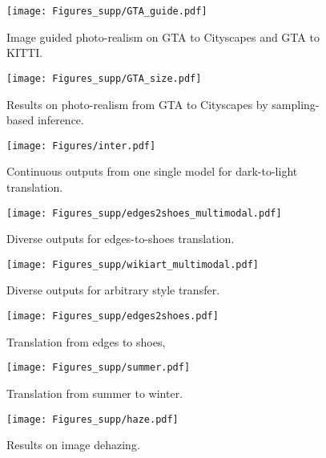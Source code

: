 \documentclass[runningheads]{llncs}
\begin{document}
\begin{figure*}
  \centering
  \texttt{[image: Figures\_supp/GTA\_guide.pdf]}
  \caption{Image guided photo-realism on GTA\cite{richter2016playing} to Cityscapes\cite{cordts2016cityscapes} and GTA to KITTI\cite{geiger2015kitti}.}
  \label{fig:gg}
\end{figure*}

\begin{figure*}
  \centering
  \texttt{[image: Figures\_supp/GTA\_size.pdf]}
  \caption{Results on photo-realism from GTA\cite{richter2016playing} to Cityscapes\cite{cordts2016cityscapes} by sampling-based inference.}
  \label{fig:gs}
\end{figure*}

\begin{figure*}
  \centering
  \texttt{[image: Figures/inter.pdf]}
  \caption{Continuous outputs from one single model for dark-to-light translation.}
  \label{fig:interpolation}
\end{figure*}

\begin{figure*}
  \centering
  \texttt{[image: Figures\_supp/edges2shoes\_multimodal.pdf]}
  \caption{Diverse outputs for edges-to-shoes translation.}
  \label{fig:edge2shoe_multimodal}
\end{figure*}

\begin{figure*}
  \centering
  \texttt{[image: Figures\_supp/wikiart\_multimodal.pdf]}
  \caption{Diverse outputs for arbitrary style transfer.}
  \label{fig:wikiart_multimodal}
\end{figure*}

\begin{figure*}
  \centering
  \texttt{[image: Figures\_supp/edges2shoes.pdf]}
  \caption{Translation from edges to shoes\cite{xie15hed},\cite{fine-grained}}
  \label{fig:edge2shoe}
\end{figure*}

\begin{figure*}
  \centering
  \texttt{[image: Figures\_supp/summer.pdf]}
  \caption{Translation from summer to winter\cite{zhu2017unpaired}.}
  \label{fig:summer}
\end{figure*}

\begin{figure*}
  \centering
  \texttt{[image: Figures\_supp/haze.pdf]}
  \caption{Results on image dehazing.\cite{Dense-Haze_2019}}
  \label{fig:haze}
\end{figure*}
\end{document}
